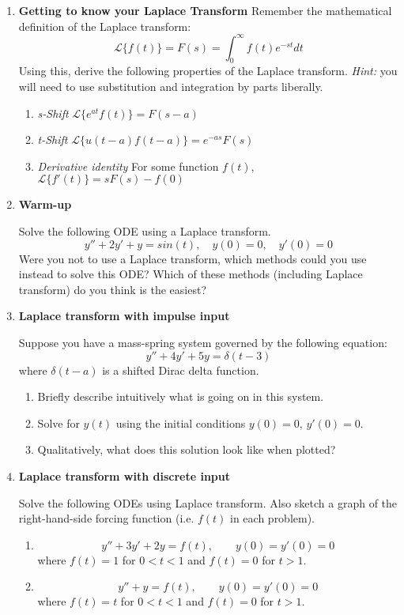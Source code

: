 \documentclass[letterpaper, fontsize=11pt]{scrartcl} %
\numberwithin{equation}{section} %
\numberwithin{figure}{section} %
\numberwithin{table}{section} %
\begin{document}
\begin{enumerate}
\item \textbf{Getting to know your Laplace Transform} \newline Remember the mathematical definition of the Laplace transform:
$$ \mathcal{L}\{f(t)\} = F(s) = \int_0^\infty f(t)e^{-st}dt$$
Using this, derive the following properties of the Laplace transform. \textit{Hint:} you will need to use substitution and integration by parts liberally.
\begin{enumerate}
\item \textit{s-Shift} $ \mathcal{L}\{e^{at}f(t)\} = F(s-a)$
\item \textit{t-Shift} $ \mathcal{L}\{u(t-a)f(t-a)\} = e^{-as}F(s)$
\item \textit{Derivative identity} For some function $f(t)$, $ \mathcal{L}\{f'(t)\} = sF(s) - f(0)$
\end{enumerate}

\item \textbf{Warm-up} \par Solve the following ODE using a Laplace transform. \newline
$$y'' + 2y' + y = sin(t), \quad y(0) = 0, \quad y'(0) = 0$$
Were you not to use a Laplace transform, which methods could you use instead to solve this ODE? Which of these methods (including Laplace transform) do you think is the easiest?

\item \textbf{Laplace transform with impulse input}  \par Suppose you have a mass-spring system governed by the following equation:
$$y'' + 4y' + 5y = \delta(t-3)$$ where $\delta(t-a)$ is a shifted Dirac delta function. 
\begin{enumerate}
\item Briefly describe intuitively what is going on in this system. 
\item Solve for $y(t)$ using the initial conditions $y(0) = 0$, $y'(0) = 0$. 
\item Qualitatively, what does this solution look like when plotted? 
\end{enumerate}

\item \textbf{Laplace transform with discrete input} 
\par Solve the following ODEs using Laplace transform. Also sketch a graph of the right-hand-side forcing function (i.e. $f(t)$ in each problem). 
\begin{enumerate}
\item 
$$y'' + 3y' + 2y = f(t),\qquad y(0) = y'(0) = 0$$  
where $f(t) = 1$ for $0 < t < 1$ and $f(t) = 0$ for $t > 1$. 

\item $$y'' + y = f(t),\qquad y(0) = y'(0) = 0$$  
where $f(t) = t$ for $0 < t < 1$ and $f(t) = 0$ for $t > 1$. 

\end{enumerate}

\end{enumerate}

\end{document}
